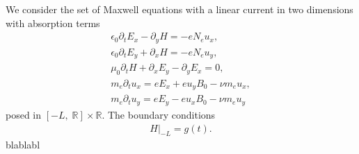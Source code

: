 
We consider the set of Maxwell equations with a linear current in two dimensions \cite{stable_yee_plasma_current}
 with absorption terms
 \begin{align*}
\epsilon_0\partial_t E_{x}-\partial_y H=-eN_e u_x,\\
\epsilon_0\partial_t E_{y}+\partial_x H=-eN_e u_y,\\
\mu_0\partial_t H+\partial_x E_y-\partial_y E_x=0,\\
m_e\partial_t u_x=eE_x+eu_yB_0-\nu m_e u_x,\\
m_e\partial_t u_y=eE_y-eu_xB_0-\nu m_e u_y
\end{align*}
posed in $[-L,\; \mathbb{R}]\times \mathbb{R}$. The boundary conditions 
\begin{align*}
 H|_{-L}=g(t).
\end{align*}
blablabl